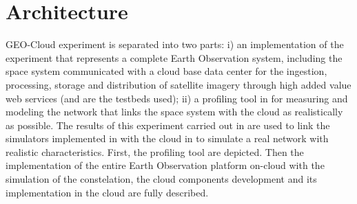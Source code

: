 \chapter{Architecture}

 GEO-Cloud experiment is separated into two parts: i) an
implementation of the experiment
that represents a complete Earth Observation system, including the space system
communicated with a cloud base data center for the ingestion, processing,
storage and distribution of satellite imagery through high added value web
services (\vw and \bonfire are the testbeds used); ii) a profiling tool in \pl for
measuring and modeling the network that links the space system with the cloud as
realistically as possible. The results of this experiment carried out in \pl are
used to link the simulators implemented in \vw with the cloud in \bonfire to
simulate a real network with realistic characteristics. 
First, the \pl profiling tool are depicted. Then the implementation of the
entire Earth Observation platform on-cloud with the simulation of the
constelation, the cloud components development and its implementation in the
\bonfire cloud are fully described.




